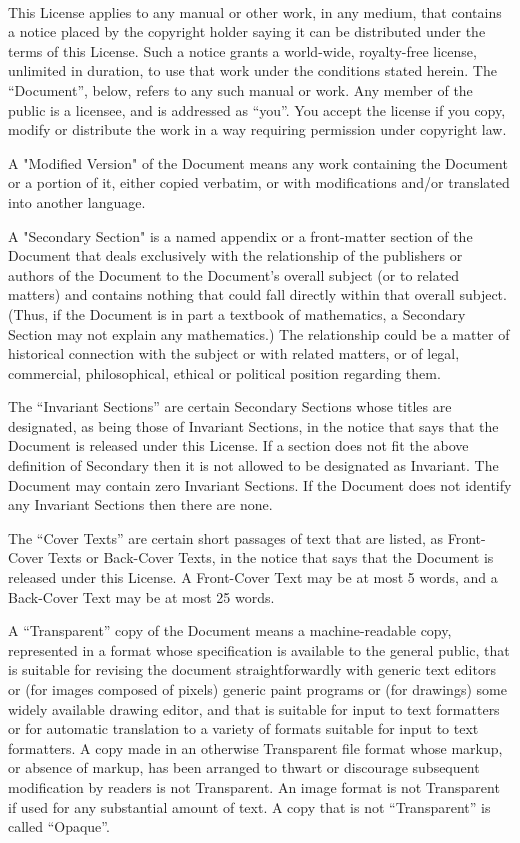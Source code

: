 \bigskip{}\\

\noindent
This License applies to any manual or other work, in any medium, that contains a notice placed by the copyright holder saying it can be distributed under the terms of this License.  Such a notice grants a world-wide, royalty-free license, unlimited in duration, to use that work under the conditions stated herein.  The "`Document"', below,
refers to any such manual or work. Any member of the public is a licensee, and is addressed as "`you"'.  You accept the license if you copy, modify or distribute the work in a way requiring permission under copyright law.

A "Modified Version" of the Document means any work containing the Document or a portion of it, either copied verbatim, or with modifications and/or translated into another language.

A "Secondary Section" is a named appendix or a front-matter section of the Document that deals exclusively with the relationship of the publishers or authors of the Document to the Document's overall subject (or to related matters) and contains nothing that could fall directly within that overall subject.  (Thus, if the Document is in part a textbook of mathematics, a Secondary Section may not explain any mathematics.)  The relationship could be a matter of historical connection with the subject or with related matters, or of legal, commercial, philosophical, ethical or political position regarding them.

The "`Invariant Sections"' are certain Secondary Sections whose titles are designated, as being those of Invariant Sections, in the notice that says that the Document is released under this License.  If a section does not fit the above definition of Secondary then it is not allowed to be designated as Invariant.  The Document may contain zero Invariant Sections.  If the Document does not identify any Invariant Sections then there are none.

The "`Cover Texts"' are certain short passages of text that are listed, as Front-Cover Texts or Back-Cover Texts, in the notice that says that the Document is released under this License.  A Front-Cover Text may be at most 5 words, and a Back-Cover Text may be at most 25 words.

A "`Transparent"' copy of the Document means a machine-readable copy, represented in a format whose specification is available to the general public, that is suitable for revising the document straightforwardly with generic text editors or (for images composed of pixels) generic paint programs or (for drawings) some widely available drawing editor, and that is suitable for input to text formatters or for automatic translation to a variety of formats suitable for input
to text formatters.  A copy made in an otherwise Transparent file format whose markup, or absence of markup, has been arranged to thwart or discourage subsequent modification by readers is not Transparent. An image format is not Transparent if used for any substantial amount of text.  A copy that is not "`Transparent"' is called "`Opaque"'.

